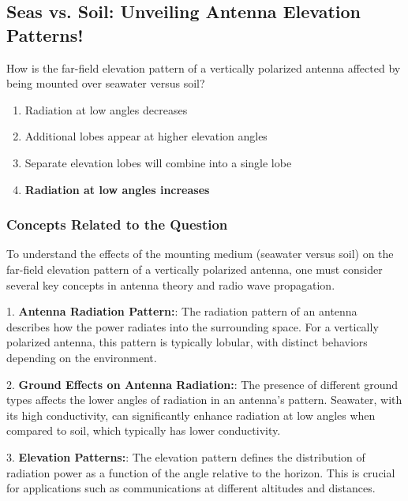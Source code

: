 \subsection{Seas vs. Soil: Unveiling Antenna Elevation Patterns!}

\begin{tcolorbox}[colback=gray!10, colframe=black, title=E9C11]
How is the far-field elevation pattern of a vertically polarized antenna affected by being mounted over seawater versus soil? 

\begin{enumerate}[label=\Alph*.]
    \item Radiation at low angles decreases
    \item Additional lobes appear at higher elevation angles
    \item Separate elevation lobes will combine into a single lobe
    \item \textbf{Radiation at low angles increases}
\end{enumerate} \end{tcolorbox}

\subsubsection{Concepts Related to the Question}

To understand the effects of the mounting medium (seawater versus soil) on the far-field elevation pattern of a vertically polarized antenna, one must consider several key concepts in antenna theory and radio wave propagation.

1. \textbf{Antenna Radiation Pattern:}: The radiation pattern of an antenna describes how the power radiates into the surrounding space. For a vertically polarized antenna, this pattern is typically lobular, with distinct behaviors depending on the environment.

2. \textbf{Ground Effects on Antenna Radiation:}: The presence of different ground types affects the lower angles of radiation in an antenna's pattern. Seawater, with its high conductivity, can significantly enhance radiation at low angles when compared to soil, which typically has lower conductivity.

3. \textbf{Elevation Patterns:}: The elevation pattern defines the distribution of radiation power as a function of the angle relative to the horizon. This is crucial for applications such as communications at different altitudes and distances.

